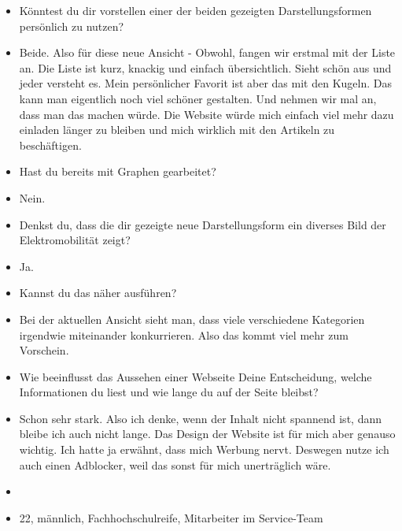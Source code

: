 {\begin{itemize}[]
        \item {} Könntest du dir vorstellen einer der beiden gezeigten Darstellungsformen persönlich zu nutzen?
        \item {} Beide.
              Also für diese neue Ansicht - Obwohl, fangen wir erstmal mit der Liste an.
              Die Liste ist kurz, knackig und einfach übersichtlich.
              Sieht schön aus und jeder versteht es.
              Mein persönlicher Favorit ist aber das mit den Kugeln.
              Das kann man eigentlich noch viel schöner gestalten.
              Und nehmen wir mal an, dass man das machen würde.
              Die Website würde mich einfach viel mehr dazu einladen länger zu bleiben und mich wirklich mit den Artikeln zu beschäftigen.
        \item {} Hast du bereits mit Graphen gearbeitet?
        \item {} Nein.
        \item {} Denkst du, dass die dir gezeigte neue Darstellungsform ein diverses Bild der Elektromobilität zeigt?
        \item {} Ja.
        \item {} Kannst du das näher ausführen?
        \item {} Bei der aktuellen Ansicht sieht man, dass viele verschiedene Kategorien irgendwie miteinander konkurrieren.
              Also das kommt viel mehr zum Vorschein.
        \item {} Wie beeinflusst das Aussehen einer Webseite Deine Entscheidung, welche Informationen du liest und wie lange du auf der Seite bleibst?
        \item {} Schon sehr stark. Also ich denke, wenn der Inhalt nicht spannend ist, dann bleibe ich auch nicht lange.
              Das Design der Website ist für mich aber genauso wichtig.
              Ich hatte ja erwähnt, dass mich Werbung nervt.
              Deswegen nutze ich auch einen Adblocker, weil das sonst für mich unerträglich wäre.
        \item {}
        \item {} 22, männlich, Fachhochschulreife, Mitarbeiter im Service-Team
    \end{itemize}}
\nolinenumbers
